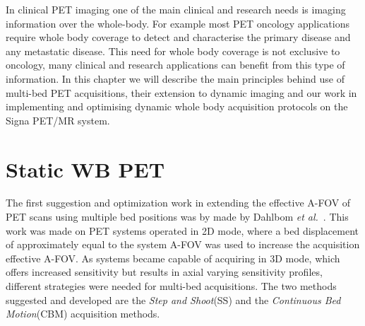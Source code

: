 In clinical PET imaging one of the main clinical and research needs is imaging information over the whole-body. For example most PET oncology applications require whole body coverage to detect and characterise the primary disease and any metastatic disease. This need for whole body coverage is not exclusive to oncology, many clinical and research applications can benefit from this type of information. In this chapter we will describe the main principles behind use of multi-bed PET acquisitions, their extension to dynamic imaging and our work in implementing and optimising dynamic whole body acquisition protocols on the Signa PET/MR system. 

\section{Static WB PET}
The first suggestion and optimization work in extending the effective A-FOV of PET scans using multiple bed positions was by made by Dahlbom \textit{et al.}~\cite{Dahlbom1992}. This work was made on PET systems operated in 2D mode, where a bed displacement of approximately equal to the system A-FOV was used to increase the acquisition effective A-FOV. As systems became capable of acquiring in 3D mode, which offers increased sensitivity but results in axial varying sensitivity profiles, different strategies were needed for multi-bed acquisitions. The two methods suggested and developed are the \textit{Step and Shoot}(SS) and the \textit{Continuous Bed Motion}(CBM) acquisition methods. 

